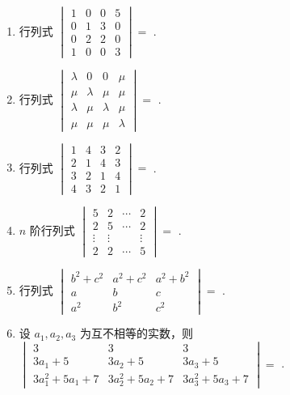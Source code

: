 \documentclass[12pt, a4paper]{ctexart}
\begin{document}
\begin{enumerate}
    \item 行列式 $ \begin{vmatrix} 1 & 0 & 0 & 5 \\ 0 & 1 & 3 & 0 \\ 0 & 2 & 2 & 0 \\ 1 & 0 & 0 & 3 \end{vmatrix} = $ \underline{\hspace{2cm}}.

    \item 行列式 $ \begin{vmatrix} \lambda & 0 & 0 & \mu \\ \mu & \lambda & \mu & \mu \\ \lambda & \mu & \lambda & \mu \\ \mu & \mu & \mu & \lambda \end{vmatrix} = $ \underline{\hspace{2cm}}.

    \item 行列式 $ \begin{vmatrix} 1 & 4 & 3 & 2 \\ 2 & 1 & 4 & 3 \\ 3 & 2 & 1 & 4 \\ 4 & 3 & 2 & 1 \end{vmatrix} = $ \underline{\hspace{2cm}}.

    \item $n$ 阶行列式 $ \begin{vmatrix} 5 & 2 & \cdots & 2 \\ 2 & 5 & \cdots & 2 \\ \vdots & \vdots & & \vdots \\ 2 & 2 & \cdots & 5 \end{vmatrix} = $ \underline{\hspace{2cm}}.

    \item 行列式 $ \begin{vmatrix} b^{2} + c^{2} & a^{2} + c^{2} & a^{2} + b^{2} \\ a & b & c \\ a^{2} & b^{2} & c^{2} \end{vmatrix} = $ \underline{\hspace{2cm}}.

    \item 设 $ a_{1}, a_{2}, a_{3} $ 为互不相等的实数，则 $ \begin{vmatrix} 3 & 3 & 3 \\ 3a_{1} + 5 & 3a_{2} + 5 & 3a_{3} + 5 \\ 3a_{1}^{2} + 5a_{1} + 7 & 3a_{2}^{2} + 5a_{2} + 7 & 3a_{3}^{2} + 5a_{3} + 7 \end{vmatrix} = $ \underline{\hspace{2cm}}.


\end{enumerate}
\end{document}
